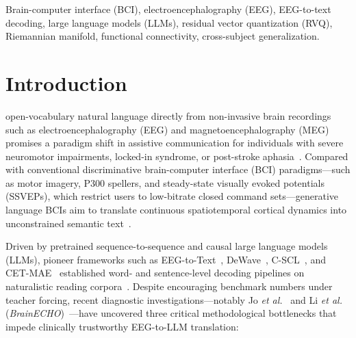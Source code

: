 \documentclass[journal]{IEEEtran}
\begin{document}
\begin{abstract}
($23.0\times$ over noise). When controlled on the identical \texttt{BART-large} (406M) backbone and single-task \texttt{task1-SR}, RUSH-EEG2Text achieves $\mathbf{16.38\%}$ BLEU-1 and $\mathbf{0.97\%}$ BLEU-4, outperforming prior BART-based baselines under non-teacher-forced generation.
\end{abstract}

\begin{IEEEkeywords}
Brain-computer interface (BCI), electroencephalography (EEG), EEG-to-text decoding, large language models (LLMs), residual vector quantization (RVQ), Riemannian manifold, functional connectivity, cross-subject generalization.
\end{IEEEkeywords}

\section{Introduction}
 open-vocabulary natural language directly from non-invasive brain recordings such as electroencephalography (EEG) and magnetoencephalography (MEG) promises a paradigm shift in assistive communication for individuals with severe neuromotor impairments, locked-in syndrome, or post-stroke aphasia~\cite{wang2022open, defossez2023decoding, wang2026genai_bci}. Compared with conventional discriminative brain-computer interface (BCI) paradigms---such as motor imagery, P300 spellers, and steady-state visually evoked potentials (SSVEPs), which restrict users to low-bitrate closed command sets---generative language BCIs aim to translate continuous spatiotemporal cortical dynamics into unconstrained semantic text~\cite{wang2024cetmae, li2025brainecho}.

Driven by pretrained sequence-to-sequence and causal large language models (LLMs), pioneer frameworks such as EEG-to-Text~\cite{wang2022open}, DeWave~\cite{duan2023dewave}, C-SCL~\cite{feng2023cscl}, and CET-MAE~\cite{wang2024cetmae} established word- and sentence-level decoding pipelines on naturalistic reading corpora~\cite{hollenstein2018zuco, hollenstein2020zuco2}. Despite encouraging benchmark numbers under teacher forcing, recent diagnostic investigations---notably Jo \textit{et al.}~\cite{jo2024are} and Li \textit{et al.} (\textit{BrainECHO})~\cite{li2025brainecho}---have uncovered three critical methodological bottlenecks that impede clinically trustworthy EEG-to-LLM translation:
\end{document}
